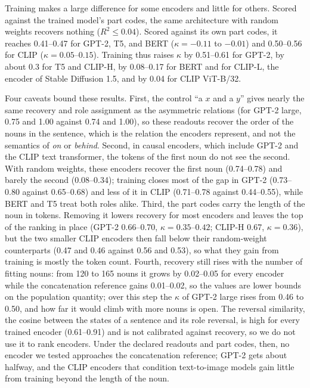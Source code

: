 \documentclass[10pt]{article}
\theoremstyle{plain}
\theoremstyle{remark}
\begin{document}
Training makes a large difference for some encoders and little for others. Scored against the trained model's part codes, the same architecture with random weights recovers nothing ($R^2 \le 0.04$). Scored against its own part codes, it reaches 0.41--0.47 for GPT-2, T5, and BERT ($\kappa = -0.11$ to $-0.01$) and 0.50--0.56 for CLIP ($\kappa = 0.05$--$0.15$). Training thus raises $\kappa$ by 0.51--0.61 for GPT-2, by about 0.3 for T5 and CLIP-H, by 0.08--0.17 for BERT and for CLIP-L, the encoder of Stable Diffusion 1.5, and by 0.04 for CLIP ViT-B/32.

Four caveats bound these results. First, the control ``a $x$ and a $y$'' gives nearly the same recovery and role assignment as the asymmetric relations (for GPT-2 large, 0.75 and 1.00 against 0.74 and 1.00), so these readouts recover the order of the nouns in the sentence, which is the relation the encoders represent, and not the semantics of \emph{on} or \emph{behind}. Second, in causal encoders, which include GPT-2 and the CLIP text transformer, the tokens of the first noun do not see the second. With random weights, these encoders recover the first noun (0.74--0.78) and barely the second (0.08--0.34); training closes most of the gap in GPT-2 (0.73--0.80 against 0.65--0.68) and less of it in CLIP (0.71--0.78 against 0.44--0.55), while BERT and T5 treat both roles alike. Third, the part codes carry the length of the noun in tokens. Removing it lowers recovery for most encoders and leaves the top of the ranking in place (GPT-2 0.66--0.70, $\kappa = 0.35$--$0.42$; CLIP-H 0.67, $\kappa = 0.36$), but the two smaller CLIP encoders then fall below their random-weight counterparts (0.47 and 0.46 against 0.56 and 0.53), so what they gain from training is mostly the token count. Fourth, recovery still rises with the number of fitting nouns: from 120 to 165 nouns it grows by 0.02--0.05 for every encoder while the concatenation reference gains 0.01--0.02, so the values are lower bounds on the population quantity; over this step the $\kappa$ of GPT-2 large rises from 0.46 to 0.50, and how far it would climb with more nouns is open. The reversal similarity, the cosine between the states of a sentence and its role reversal, is high for every trained encoder (0.61--0.91) and is not calibrated against recovery, so we do not use it to rank encoders. Under the declared readouts and part codes, then, no encoder we tested approaches the concatenation reference; GPT-2 gets about halfway, and the CLIP encoders that condition text-to-image models gain little from training beyond the length of the noun.
\end{document}
